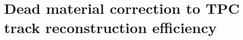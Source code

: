 
\chapter{Dead material correction to TPC track reconstruction efficiency}\label{appendix:deadMaterial}